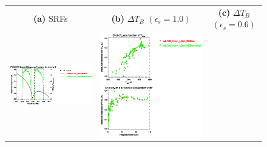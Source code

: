 \begin{figure}[H]
  \centering
  \begin{tabular}{c c c}
    \textsf{\textbf{(a)} SRFs} &
    \textsf{\textbf{(b)} $\Delta T_B$ $(\epsilon_s = 1.0)$} &
    \textsf{\textbf{(c)} $\Delta T_B$ $(\epsilon_s = 0.6)$} \\
    \includegraphics[bb=80 400 280 558,clip,scale=0.85]{graphics/srf/Rset/atms_npp.ch6.osrf.eps} &
    \includegraphics[bb=85 400 260 558,clip,scale=0.85]{graphics/dtb/Rset/e1.0_r0.0/atms_npp.ch6.dTb.eps} & 

\end{tabular}
\end{figure}
